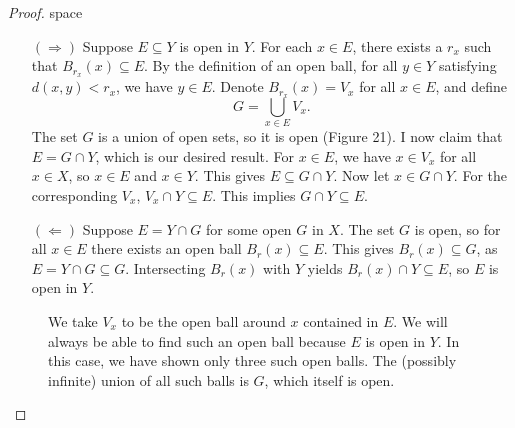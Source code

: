 \documentclass{article}
\theoremstyle{definition}
\begin{document}
	\begin{proof}{\color{white}space}
		\begin{enumerate}
			\item[$ (\Longrightarrow) $] Suppose $ E\subseteq Y $ is open in $ Y $. For each $ x\in E $, there exists a $ r_x $ such that $ B_{r_x}(x)\subseteq E $. By the definition of an open ball, for all $ y\in Y $ satisfying $ d(x,y)<r_x $, we have $ y\in E $. Denote $ B_{r_x}(x)=V_x $ for all $ x\in E $, and define $$G=\bigcup_{x\in E}V_x .$$ The set $ G $ is a union of open sets, so it is open (Figure 21). I now claim that $ E=G\cap Y $, which is our desired result. For $ x\in E $, we have $ x\in V_x $ for all $ x\in X $, so $ x\in E $ and $ x\in Y $. This gives $ E\subseteq G\cap Y $. Now let $ x\in G\cap Y $. For the corresponding $ V_x $, $ V_x\cap Y\subseteq E $. This implies $ G\cap Y\subseteq E $.    
			\item[$ (\Longleftarrow) $] Suppose $ E=Y\cap G $ for some open $ G $ in $ X $. The set $ G $ is open, so for all $ x\in E $ there exists an open ball $ B_r(x)\subseteq E $. This gives $ B_r(x)\subseteq G $, as $ E=Y\cap G\subseteq G $. Intersecting $ B_r(x) $ with $ Y $ yields $ B_r(x)\cap Y\subseteq E $, so $ E $ is open in $ Y $.  
		\end{enumerate}	
		\begin{figure}[h!]
			\centering
			\caption{We take $ V_x $ to be the open ball around $ x $ contained in $ E $. We will always be able to find such an open ball because $ E $ is open in $ Y $. In this case, we have shown only three such open balls. The (possibly infinite) union of all such balls is $ G $, which itself is open.}  
		\end{figure}
	\end{proof}
\end{document}
